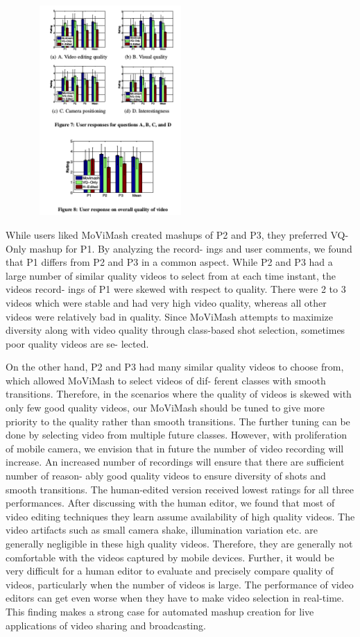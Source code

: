 \documentclass{sig-alternate}
\begin{document}
\includegraphics[height = 8cm ,width=8cm]{fig8.png}

\par While users liked MoViMash created mashups of P2 and P3,
they preferred VQ-Only mashup for P1. By analyzing the record-
ings and user comments, we found that P1 differs from P2 and P3 in
a common aspect. While P2 and P3 had a large number of similar
quality videos to select from at each time instant, the videos record-
ings of P1 were skewed with respect to quality. There were 2 to 3
videos which were stable and had very high video quality, whereas
all other videos were relatively bad in quality. Since MoViMash
attempts to maximize diversity along with video quality through
class-based shot selection, sometimes poor quality videos are se-
lected.

On the other hand, P2 and P3 had many similar quality videos
to choose from, which allowed MoViMash to select videos of dif-
ferent classes with smooth transitions. Therefore, in the scenarios
where the quality of videos is skewed with only few good quality
videos, our MoViMash should be tuned to give more priority to
the quality rather than smooth transitions. The further tuning can
be done by selecting video from multiple future classes. However,
with proliferation of mobile camera, we envision that in future the
number of video recording will increase. An increased number of
recordings will ensure that there are sufficient number of reason-
ably good quality videos to ensure diversity of shots and smooth
transitions.
The human-edited version received lowest ratings for all three
performances. After discussing with the human editor, we found
that most of video editing techniques they learn assume availability
of high quality videos. The video artifacts such as small camera shake, illumination variation etc. are generally negligible in these
high quality videos. Therefore, they are generally not comfortable
with the videos captured by mobile devices. Further, it would be
very difficult for a human editor to evaluate and precisely compare
quality of videos, particularly when the number of videos is large.
The performance of video editors can get even worse when they
have to make video selection in real-time. This finding makes a
strong case for automated mashup creation for live applications of
video sharing and broadcasting.
\end{document}
